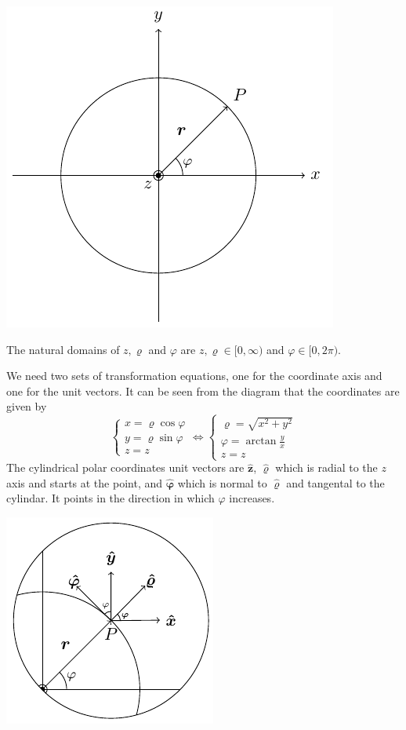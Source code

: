 \documentclass{article}
\newcommand{\vh}[1]{\vec{\hat{#1}}}
\renewcommand{\vec}[1]{\bm{#1}}
\begin{document}
\begin{center}
\includegraphics[scale=0.4]{PolarCoordinatesTopDown}
\end{center}

The natural domains of \(z,\varrho\) and \(\varphi\) are \(z,\varrho\in[0,\infty)\) and \(\varphi\in[0,2\pi)\).

We need two sets of transformation equations, one for the coordinate axis and one for the unit vectors. It can be seen from the diagram that the coordinates are given by
\[\left\{
\begin{array}{l}
x = \varrho\cos\varphi\\
y = \varrho\sin\varphi\\
z = z
\end{array}
\right.\iff\left\{
\begin{array}{l}
\varrho = \sqrt{x^2+y^2}\\
\varphi = \arctan\frac yx\\
z = z
\end{array}
\right.\]
The cylindrical polar coordinates unit vectors are \(\vh z\), \(\vh\varrho\) which is radial to the \(z\) axis and starts at the point, and \(\vh\varphi\) which is normal to \(\vh\varrho\) and tangental to the cylindar. It points in the direction in which \(\varphi\) increases.

\begin{center}
\includegraphics[scale=0.6]{CylindricalPolarUnitVectors}
\end{center}
\end{document}
